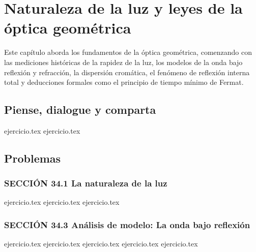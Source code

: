 \chapter{Naturaleza de la luz y leyes de la óptica geométrica}
\label{cap:naturaleza_de_la_luz_y_leyes_de_la_optica_geometrica}

Este capítulo aborda los fundamentos de la óptica geométrica, comenzando con las mediciones históricas de la rapidez de la luz, los modelos de la onda bajo reflexión y refracción, la dispersión cromática, el fenómeno de reflexión interna total y deducciones formales como el principio de tiempo mínimo de Fermat.

\section*{Piense, dialogue y comparta}
\begin{enumerate}
    {ejercicio.tex}
    {ejercicio.tex}
\end{enumerate}

\section*{Problemas}

\subsection*{SECCIÓN 34.1 La naturaleza de la luz}
\begin{enumerate}
    {ejercicio.tex}
    {ejercicio.tex}
    {ejercicio.tex}
\end{enumerate}

\subsection*{SECCIÓN 34.3 Análisis de modelo: La onda bajo reflexión}
\begin{enumerate}
    \setcounter{enumi}{3}
    {ejercicio.tex}
    {ejercicio.tex}
    {ejercicio.tex}
    {ejercicio.tex}
    {ejercicio.tex}
\end{enumerate}

